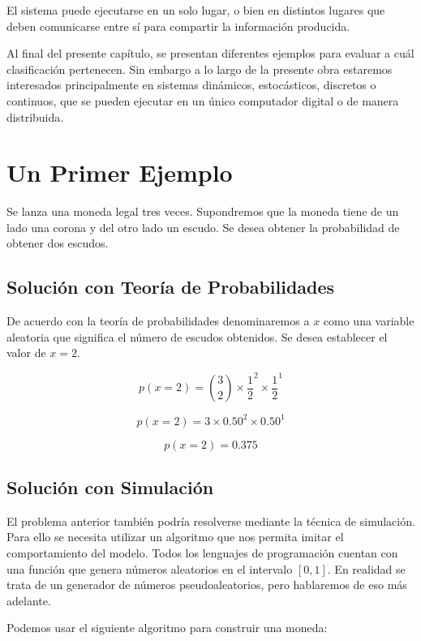 El sistema puede ejecutarse en un solo lugar, o bien en distintos lugares que deben comunicarse entre sí para compartir la información producida.

Al final del presente capítulo, se presentan diferentes ejemplos para evaluar a cuál clasificación pertenecen. Sin embargo a lo largo de la presente obra estaremos interesados principalmente en sistemas dinámicos, estocásticos, discretos o continuos, que se pueden ejecutar en un único computador digital o de manera distribuida.



\section{Un Primer Ejemplo}

Se lanza una moneda legal tres veces. Supondremos que la moneda tiene de un lado una corona y del otro lado un escudo. Se desea obtener la probabilidad de obtener dos escudos.



\subsection{Solución con Teoría de Probabilidades}

De acuerdo con la teoría de probabilidades denominaremos a $x$ como una variable aleatoria que significa el número de escudos obtenidos. Se desea establecer el valor de $x=2$.

$$p(x=2) = \binom{3}{2}\times \frac{1}{2}^2 \times \frac{1}{2}^1$$  

$$p(x=2) = 3 \times 0.50^2 \times 0.50^1$$ 

$$p(x=2) = 0.375$$




\subsection{Solución con Simulación}


El problema anterior también podría resolverse mediante la técnica de simulación. Para ello se necesita utilizar un algoritmo que nos permita imitar el comportamiento del modelo. Todos los lenguajes de programación cuentan con una función que genera números aleatorios en el intervalo $[0,1]$. En realidad se trata de un generador de números pseudoaleatorios, pero hablaremos de eso más adelante.

Podemos usar el siguiente algoritmo para construir una moneda:

